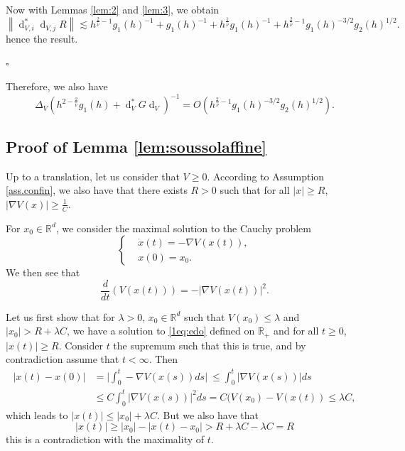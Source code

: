 \documentclass[12pt]{amsart}
\newcommand{\R}{\mathbb R}
\newcommand{\ep}{\hfill $\square$}
\renewcommand{\d}{\operatorname{d}}
\numberwithin{equation}{section}
\numberwithin{figure}{section}
\newcommand{\vvert}[1]{\left\lVert#1\right\rVert}
\begin{document}
Now with Lemmas \ref{lem:2} and \ref{lem:3}, we obtain
\begin{equation*}
\vvert{\d_{V,i}^*\d_{V,j}R} \lesssim h^{\frac{2}{\overline{\nu}} - 1}g_1(h)^{-1} + g_1(h)^{-1} + h^{\frac{1}{\overline{\nu}}}g_1(h)^{-1} + h^{\frac{2}{\overline{\nu}} - 1}g_1(h)^{-3/2}g_2(h)^{1/2}.
\end{equation*}
hence the result.

\ep

Therefore, we also have
\begin{equation*}
\Delta_V(h^{2-\frac2{\overline{\nu}}}g_1(h) + \d_V^*G\d_V)^{-1} = O(h^{\frac{2}{\overline{\nu}} - 1}g_1(h)^{-3/2}g_2(h)^{1/2}).
\end{equation*}










\subsection{Proof of Lemma \ref{lem:soussolaffine}}\label{sec:proofsoussolaffine}
Up to a translation, let us consider that $V\geq 0$. According to Assumption \ref{ass.confin}, we also have that there exists $R>0$ such that for all $|x|\geq R$, $|\nabla V(x)| \geq \frac1C$.

For $x_0\in\R^d$, we consider the maximal solution to the Cauchy problem
\begin{equation}\label{1eq:edo}
\left\{
\begin{aligned}
&\dot x(t) = -\nabla V(x(t)),
\\&x(0) = x_0.
\end{aligned}
\right.
\end{equation}
We then see that
\begin{equation*}
\frac{d}{dt}(V(x(t))) = -|\nabla V(x(t))|^2.
\end{equation*}

Let us first show that for $\lambda>0$, $x_0\in\R^d$ such that $V(x_0) \leq\lambda$ and $|x_0| > R + \lambda C$, we have a solution to \eqref{1eq:edo} defined on $\R_+$ and for all $t\geq0$, $|x(t)|\geq R$. Consider $t$ the supremum such that this is true, and by contradiction assume that $t<\infty$. Then
\begin{equation*}
\begin{aligned}
    |x(t) - x(0)| &= \big|\int_0^t-\nabla V(x(s))ds\big|\ \leq \int_0^t|\nabla V(x(s))|ds\\
    &\leq C\int_0^t|\nabla V(x(s))|^2ds = C(V(x_0) - V(x(t)) \leq \lambda C,
\end{aligned}
\end{equation*}
which leads to $|x(t)|\leq |x_0| + \lambda C$. But we also have that
\begin{equation*}
|x(t)| \geq |x_0| - |x(t) - x_0| > R + \lambda C - \lambda C = R
\end{equation*}
this is a contradiction with the maximality of $t$.
\end{document}
